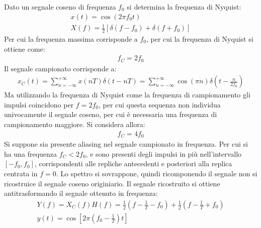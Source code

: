\documentclass{article}
\begin{document}
Dato un segnale coseno di frequenza $f_0$ si determina la frequenza di Nyquist:
\begin{gather*}
    x(t)=\cos(2\pi f_0t)\\
    X(f)=\displaystyle\frac{1}{2}\left[\delta(f-f_0)+\delta(f+f_0)\right]
\end{gather*}
Per cui la frequenza massima corrisponde a $f_0$, per cui la frequenza di Nyquist si ottiene come:
\begin{gather}
    f_C=2f_0
\end{gather}
Il segnale campionato corrisponde a:
\begin{gather*}
    x_C(t)=\displaystyle\sum_{n=-\infty}^{+\infty}x(nT)\delta(t-nT)=\sum_{n=-\infty}^{+\infty}\cos(\pi n)\delta\left(t-\frac{n}{2f_0}\right)
\end{gather*}
Ma utilizzando la frequenza di Nyquist come la frequenza di campionamento gli impulsi coincidono per $f=2f_0$, per cui questa sequenza non individua univocamente il segnale 
coseno, per cui è necessaria una frequenza di campionamento maggiore. Si considera allora:
\begin{gather*}
    f_C=4f_0
\end{gather*}
Si suppone sia presente aliasing nel segnale campionato in frequenza. Per cui si ha una frequenza $f_C<2f_0$, e sono presenti degli impulsi in più nell'intervallo $[-f_0,f_0]$, 
corrispondenti alle repliche antecedenti e posteriori alla replica centrata in $f=0$. Lo spettro si sovrappone, quindi ricomponendo il segnale non si ricostruice il 
segnale coseno originiario. 
Il segnale ricostruito si ottiene antitrasformando il segnale ottenuto in frequenza:
\begin{gather*}
    Y(f)=X_C(f)H(f)=\displaystyle\frac{1}{2}\left(f-\frac{1}{T}-f_0\right)+\frac{1}{2}\left(f-\frac{1}{T}+f_0\right)\\
    y(t)=\cos\left[2\pi \left(f_0-\frac{1}{T}\right)t\right]
\end{gather*}
\end{document}
